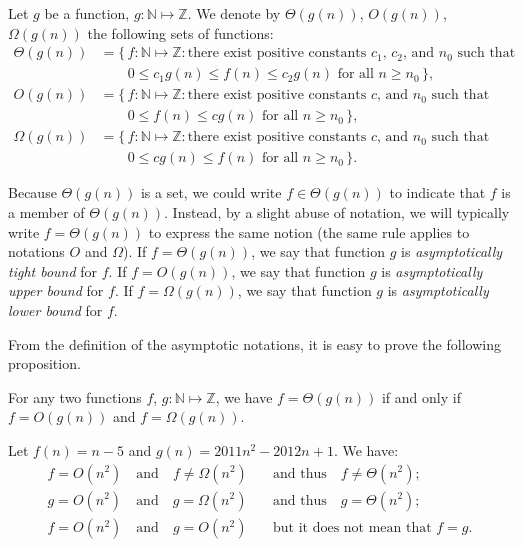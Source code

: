 \begin{definition}
    Let $g$ be a function, $g\colon\mathbb{N}\mapsto\mathbb{Z}$.
	We denote by $\Theta(g(n))$, $O(g(n))$, $\Omega(g(n))$ the following sets of functions:
	\[
		\begin{split}
			\Theta(g(n)) &= \bigl\{\,f\colon\mathbb{N}\mapsto\mathbb{Z}:\text{there exist positive constants $c_1$, $c_2$, and $n_0$ such that} \\
			&\qquad 0 \le c_1g(n)\le f(n)\le c_2g(n) \text{ for all $n\ge n_0$}\,\bigr\}, \\
			O(g(n)) &= \bigl\{\,f\colon\mathbb{N}\mapsto\mathbb{Z}:\text{there exist positive constants $c$, and $n_0$ such that} \\
			&\qquad 0 \le f(n)\le cg(n) \text{ for all $n\ge n_0$}\,\bigr\}, \\
			\Omega(g(n)) &= \bigl\{\,f\colon\mathbb{N}\mapsto\mathbb{Z}:\text{there exist positive constants $c$, and $n_0$ such that} \\
			&\qquad 0 \le cg(n)\le f(n) \text{ for all $n\ge n_0$}\,\bigr\}.
		\end{split}
	\]
\end{definition}

Because $\Theta(g(n))$ is a set, we could write $f\in\Theta(g(n))$ to indicate that $f$ is a member of $\Theta(g(n))$.
Instead, by a slight abuse of notation, we will typically write $f=\Theta(g(n))$ to express the same notion (the same rule applies to notations $O$ and $\Omega$).
If $f=\Theta(g(n))$, we say that function $g$ is \emph{asymptotically tight bound} for $f$.
If $f=O(g(n))$, we say that function $g$ is \emph{asymptotically upper bound} for $f$.
If $f=\Omega(g(n))$, we say that function $g$ is \emph{asymptotically lower bound} for $f$.

From the definition of the asymptotic notations, it is easy to prove the following proposition.

\begin{proposition}
    For any two functions $f$, $g\colon\mathbb{N}\mapsto\mathbb{Z}$, we have $f=\Theta(g(n))$ if and only if $f=O(g(n))$ and $f=\Omega(g(n))$.
\end{proposition}

\begin{Example}
    Let $f(n)=n-5$ and $g(n)=2011n^2-2012n+1$.
	We have:
	\begin{align*}
		f = O(n^2) \quad \text{and} \quad f \ne \Omega(n^2) \quad &\text{and thus} \quad f \ne \Theta(n^2); \\
		g = O(n^2) \quad \text{and} \quad g = \Omega(n^2) \quad &\text{and thus} \quad g = \Theta(n^2); \\
		f = O(n^2) \quad \text{and} \quad g = O(n^2) \quad &\text{but it does not mean that $f=g$}.
	\end{align*}
\end{Example}

